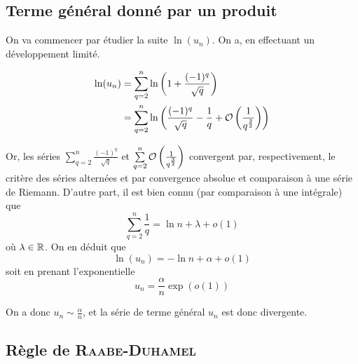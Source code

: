 \subsection{Terme général donné par un produit}

On va commencer par étudier la suite $\ln(u_n)$. On a, en effectuant un développement limité.

\[
    \begin{aligned}
        \ln(u_n)&=\sum_{q=2}^n\ln \left(1+\frac{(-1)^q}{\sqrt{q}}\right)\\
        &=\sum_{q=2}^n\ln \left(\frac{(-1)^q}{\sqrt{q}}-\frac{1}{q} + \mathcal{O}\left(\frac{1}{q^{\frac{3}{2}}}\right)\right)
    \end{aligned}
\]

Or, les séries $\sum\limits_{q=2}^n\frac{(-1)^q}{\sqrt{q}}$ et $\sum\limits_{q=2}^n  \mathcal{O}\left(\frac{1}{q^{\frac{3}{2}}}\right)$ convergent par, respectivement, le critère des séries alternées et par convergence absolue et comparaison à une série de Riemann. D'autre part, il est bien connu (par comparaison à une intégrale) que
\[
    \sum_{q=2}^n\frac{1}{q} = \ln n + \lambda + o(1)
\]
où $\lambda \in \mathbb{R}$. On en déduit que 
\[
    \ln(u_n)=-\ln n + \alpha + o(1)
\]
soit en prenant l'exponentielle
\[
    u_n=\frac{\alpha}{n}\exp(o(1))
\]

On a donc $u_n \sim \frac{\alpha}{n}$, et la série de terme général $u_n$ est donc divergente.

\subsection{Règle de \textsc{Raabe}-\textsc{Duhamel}}

